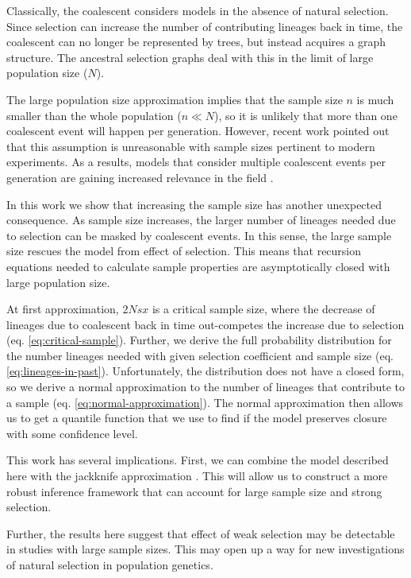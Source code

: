 \documentclass[review]{elsarticle}
\begin{document}
Classically, the coalescent considers models in the absence of natural selection. Since selection
can increase the number of contributing lineages back in time, the coalescent can no longer be
represented by trees, but instead acquires a graph structure. The ancestral selection graphs
\citep{KroneNeuhauser1997} deal with this in the limit of large population size ($N$).

The large population size approximation implies that the sample size $n$ is much smaller than the
whole population ($n \ll N$), so it is unlikely that more than one coalescent event will happen per
generation. However, recent work \citep{BhaskarEtAl2014,NelsonEtAl2019} pointed out that this
assumption is unreasonable with sample sizes pertinent to modern experiments. As a results, models
that consider multiple coalescent events per generation are gaining increased relevance in the
field \citep{FlemmingtonVoitCoalescentPapers}.

In this work we show that increasing the sample size has another unexpected consequence. As sample
size increases, the larger number of lineages needed due to selection can be masked by coalescent
events. In this sense, the large sample size rescues the model from effect of selection. This means
that recursion equations needed to calculate sample properties are asymptotically closed with large
population size.

At first approximation, $2Nsx$ is a critical sample size, where the decrease of lineages due to
coalescent back in time out-competes the increase due to selection (eq. \eqref{eq:critical-sample}).
Further, we derive the full probability distribution for the number lineages needed with given
selection coefficient and sample size (eq. \eqref{eq:lineages-in-past}). Unfortunately, the
distribution does not have a closed form, so we derive a normal approximation to the number of
lineages that contribute to a sample (eq. \eqref{eq:normal-approximation}). The normal approximation
then allows us to get a quantile function that we use to find if the model preserves closure with
some confidence level.

This work has several implications. First, we can combine the model described here with the
jackknife approximation \citep{JouganousEtAl2017}. This will allow us to construct a more robust
inference framework that can account for large sample size and strong selection.

Further, the results here suggest that effect of weak selection may be detectable in studies with
large sample sizes. This may open up a way for new investigations of natural selection in population
genetics.


\end{document}

